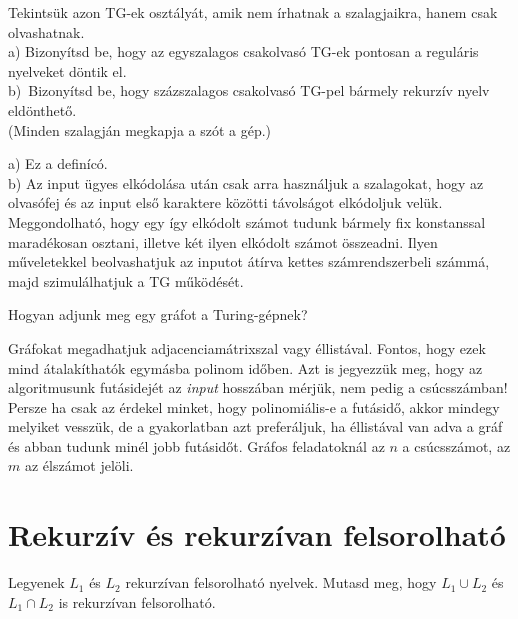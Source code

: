 \begin{Exercise}[counter={sorszam}, difficulty=0]\label{csakolvaso}
	 Tekintsük azon TG-ek osztályát, amik nem írhatnak a szalagjaikra, hanem csak olvashatnak.\\
	a) Bizonyítsd be, hogy az egyszalagos csakolvasó TG-ek pontosan a reguláris nyelveket döntik el.\\
	b)~\hard Bizonyítsd be, hogy százszalagos csakolvasó TG-pel bármely rekurzív nyelv eldönthet\H o.\\
	(Minden szalagján megkapja a szót a gép.)
\end{Exercise}	
\begin{Answer}
	a) Ez a defin\'ic\'o.\\
	b) Az input \"ugyes elk\'odol\'asa ut\'an csak arra haszn\'aljuk a szalagokat, hogy az olvas\'ofej \'es az input els\H o karaktere k\"oz\"otti t\'avols\'agot elk\'odoljuk vel\"uk.
	Meggondolhat\'o, hogy egy \'igy elk\'odolt sz\'amot tudunk b\'armely fix konstanssal marad\'ekosan osztani, illetve k\'et ilyen elk\'odolt sz\'amot \"osszeadni.
	Ilyen m\H uveletekkel beolvashatjuk az inputot \'at\'irva kettes sz\'amrendszerbeli sz\'amm\'a, majd szimul\'alhatjuk a TG m\H uk\"od\'es\'et.
\end{Answer}

\begin{Exercise}[counter={sorszam}, difficulty=0]
	Hogyan adjunk meg egy gr\'afot a Turing-g\'epnek?
\end{Exercise}	
\begin{Answer}
	Gr\'afokat megadhatjuk adjacenciam\'atrixszal vagy \'ellist\'aval. Fontos, hogy ezek mind \'atalak\'ithat\'ok egym\'asba polinom id\H oben. Azt is jegyezz\"uk meg, hogy az algoritmusunk fut\'asidej\'et az \emph{input} hossz\'aban m\'erj\"uk, nem pedig a cs\'ucssz\'amban! Persze ha csak az \'erdekel minket, hogy polinomi\'alis-e a fut\'asid\H o, akkor mindegy melyiket vessz\"uk, de a gyakorlatban azt prefer\'aljuk, ha \'ellist\'aval van adva a gr\'af \'es abban tudunk min\'el jobb fut\'asid\H ot. Gr\'afos feladatokn\'al az $n$ a cs\'ucssz\'amot, az $m$ az \'elsz\'amot jel\"oli.
\end{Answer}





\section{Rekurz\'iv \'es rekurz\'ivan felsorolhat\'o}

\begin{Exercise}[counter={sorszam}, difficulty=0]
	Legyenek $L_1$ \'es $L_2$ rekurz\'ivan felsorolhat\'o nyelvek. Mutasd meg, hogy $L_1 \cup L_2$ \'es $L_1 \cap L_2$ is rekurz\'ivan felsorolhat\'o.
\end{Exercise}	


